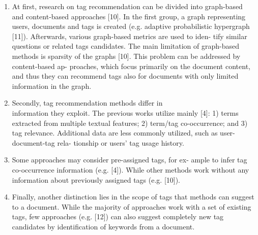 \documentclass{sig-alternate}
\begin{document}
\begin{enumerate}
\item At first, research on tag recommendation can be divided
into graph-based and content-based approaches [10]. In
the first group, a graph representing users, documents and
tags is created (e.g. adaptive probabilistic hypergraph [11]).
Afterwards, various graph-based metrics are used to iden-
tify similar questions or related tags candidates. The main
limitation of graph-based methods is sparsity of the graphs
[10]. This problem can be addressed by content-based ap-
proaches, which focus primarily on the document content,
and thus they can recommend tags also for documents
with only limited information in the graph.
\item  Secondly, tag recommendation methods differ in \\ information they exploit. The previous works utilize mainly [4]: 1)
terms extracted from multiple textual features; 2) term/tag
co-occurrence; and 3) tag relevance. Additional data are
less commonly utilized, such as user-document-tag rela-
tionship or users’ tag usage history.
\item Some approaches may consider pre-assigned tags, for ex-
ample to infer tag co-occurrence information (e.g. [4]).
While other methods work without any information about
previously assigned tags (e.g. [10]).
\item Finally, another distinction lies in the scope of tags that
methods can suggest to a document. While the majority of
approaches work with a set of existing tags, few approaches
(e.g. [12]) can also suggest completely new tag candidates
by identification of keywords from a document.
\end{enumerate}

\end{document}

